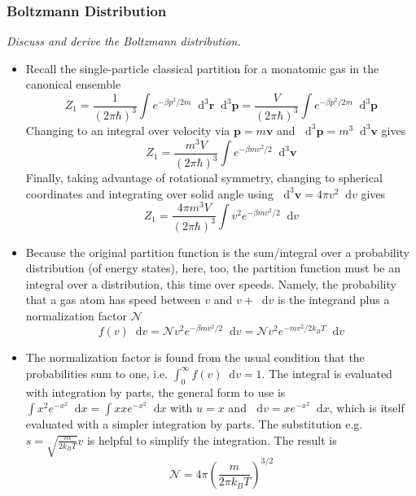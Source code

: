 \documentclass[11pt, a4paper]{article}
\newcommand{\diff}{\mathop{}\!\mathrm{d}} %
\begin{document}
\subsubsection{Boltzmann Distribution}
\textit{Discuss and derive the Boltzmann distribution.}
\begin{itemize}
	\item Recall the single-particle classical partition for a monatomic gas in the canonical ensemble
	\begin{equation*}
		Z_{1} = \frac{1}{(2\pi \hbar)^{3}}\int e^{-\beta p^{2}/2m}\diff^{3}\bm{r} \diff^{3} \bm{p} = \frac{V}{(2\pi \hbar)^{3}}\int e^{-\beta p^{2}/2m}\diff^{3} \bm{p} 
	\end{equation*} 
	Changing to an integral over velocity via $ \bm{p} = m \bm{v} $ and $\diff^{3}\bm{p} = m^{3} \diff^{3}\bm{v} $ gives
	\begin{equation*}
		Z_{1} = \frac{m^{3}V}{(2\pi\hbar)^{3}}\int e^{-\beta m v^{2}/2} \diff^{3}\bm{v}
	\end{equation*}
	Finally, taking advantage of rotational symmetry, changing to spherical coordinates and integrating over solid angle using $ \diff^{3}\bm{v} = 4\pi v^{2}\diff v $ gives
	\begin{equation*}
		Z_{1} = \frac{4\pi m^{3}V}{(2\pi\hbar)^{3}}\int v^{2} e^{-\beta m v^{2}/2} \diff v
	\end{equation*}
	
	\item Because the original partition function is the sum/integral over a probability distribution (of energy states), here, too, the partition function must be an integral over a distribution, this time over speeds. Namely, the probability that a gas atom has speed between $ v $ and $ v + \diff v $ is the integrand plus a normalization factor $ \mathcal{N} $
	\begin{equation*}
		f(v) \diff v = \mathcal{N} v^{2} e^{-\beta mv^{2}/2} \diff v = \mathcal{N} v^{2} e^{-mv^{2}/2k_{B}T} \diff v
	\end{equation*}
	
	\item The normalization factor is found from the usual condition that the probabilities sum to one, i.e. $ \int_{0}^{\infty}f(v)\diff v = 1$. The integral is evaluated with integration by parts, the general form to use is $ \int x^{2} e^{-x^{2}} \diff x = \int x x e^{-x^{2}} \diff x$ with $ u = x $ and $ \diff v =  x e^{-x^{2}} \diff x$, which is itself evaluated with a simpler integration by parts. The substitution e.g. $ s = \sqrt{\frac{m}{2k_{B}T}} v $ is helpful to simplify the integration. The result is
	\begin{equation*}
		\mathcal{N} = 4\pi \left(\frac{m}{2\pi k_{B}T} \right)^{3/2}
	\end{equation*}
	

\end{itemize}
\end{document}
